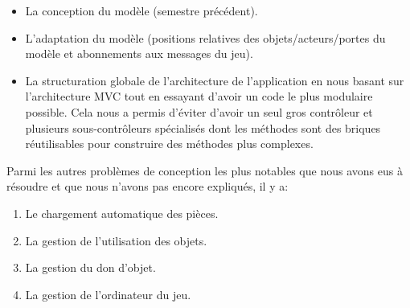 \documentclass[./standalone.tex]{subfiles}
\begin{document}
\begin{itemize}
	\item La conception du modèle (semestre précédent).
	\item L'adaptation du modèle (positions relatives des objets/acteurs/portes du modèle et abonnements aux messages du jeu).
	\item La structuration globale de l'architecture de l'application en nous basant sur l'architecture MVC tout en essayant d'avoir un code le plus modulaire possible. Cela nous a permis d'éviter d'avoir un seul gros contrôleur et plusieurs sous-contrôleurs spécialisés dont les méthodes sont des briques réutilisables pour construire des méthodes plus complexes.\\
\end{itemize}

Parmi les autres problèmes de conception les plus notables que nous avons eus à résoudre et que nous n'avons pas encore expliqués, il y a:

\begin{enumerate}
	\item Le chargement automatique des pièces.
	\item La gestion de l'utilisation des objets.
	\item La gestion du don d'objet.
	\item La gestion de l'ordinateur du jeu.
\end{enumerate}
\end{document}

